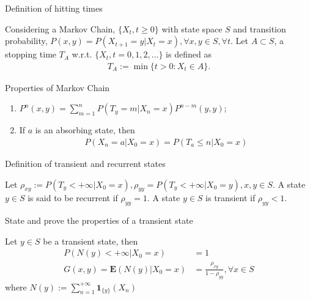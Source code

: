 \documentclass[11pt]{article}
\newcommand{\expect}[1]{\mathbf{E}(#1)}
\newcommand{\indicator}{\mathbf{1}}
\newcommand*{\xfield}[1]{\begin{mdframed}\centering #1\end{mdframed}\bigskip}
\newenvironment{field}{}{}
\newenvironment{note}{}{}
\begin{document}
%
\begin{note}
  \xfield{Definition of hitting times}
  \begin{field}
    Considering a Markov Chain, \(\{X_t, t \geq 0\}\) with state space
    \(S\) and transition probability, \(P(x,y) = P(X_{t+1} = y | X_t =
    x), \forall x,y \in S, \forall t\). Let \(A \subset S\), a
    stopping time \(T_A\) w.r.t. \(\{X_t, t = 0,1,2,\ldots\}\) is
    defined as
    \begin{align*}
      T_A := \min \{t > 0: X_t \in A\}.
    \end{align*}
  \end{field}
\end{note}
%
\begin{note}
  \xfield{Properties of Markov Chain}
  \begin{field}
    \begin{enumerate}
    \item \(P^n(x,y) = \sum_{m=1}^n P(T_y = m | X_n = x) P^{n-m}(y,y)\);
    \item If \(a\) is an absorbing state, then
      \begin{align*}
        P(X_n = a | X_0 = x) = P(T_a \leq n | X_0 = x)
      \end{align*}
    \end{enumerate}
  \end{field}
\end{note}
%
\begin{note}
  \xfield{Definition of transient and recurrent states}
  \begin{field}
    Let \(\rho_{xy} := P(T_y < +\infty | X_0 = x), \rho_{yy} = P(T_y <
    +\infty | X_0 = y), x,y \in S\). A state \(y \in S\) is said to be
    recurrent if \(\rho_{yy} = 1\). A state \(y \in S\) is transient
    if \(\rho_{yy} < 1\).
  \end{field}
\end{note}
%
\begin{note}
  \xfield{State and prove the properties of a transient state}
  \begin{field}
    Let \(y \in S\) be a transient state, then
    \begin{align*}
      P(N(y) < +\infty | X_0 = x) & = 1\\
      G(x,y) = \expect{N(y) | X_0 = x} & = \frac{\rho_{xy}}{1 -
      \rho_{yy}}, \forall x \in S
    \end{align*}
    where \(N(y) := \sum_{n=1}^{+\infty} \indicator_{\{y\}}(X_n)\)
  \end{field}
\end{note}
\end{document}
